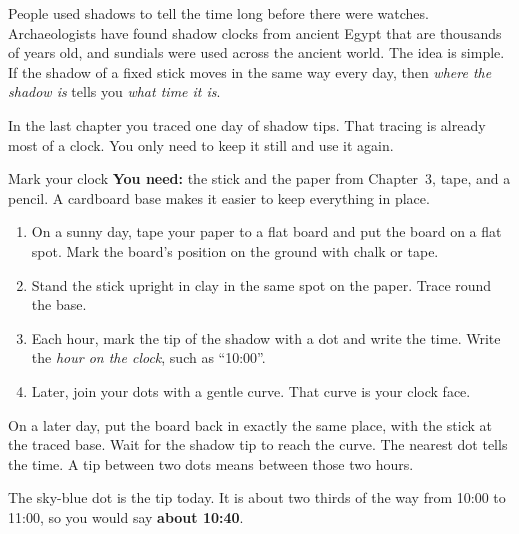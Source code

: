\label{ch4}

People used shadows to tell the time long before there were watches. Archaeologists have found shadow clocks from ancient Egypt that are thousands of years old, and sundials were used across the ancient world. The idea is simple. If the shadow of a fixed stick moves in the same way every day, then \emph{where the shadow is} tells you \emph{what time it is}.

In the last chapter you traced one day of shadow tips. That tracing is already most of a clock. You only need to keep it still and use it again.

\begin{tryit}{Mark your clock}
\textbf{You need:} the stick and the paper from Chapter~3, tape, and a pencil. A cardboard base makes it easier to keep everything in place.
\begin{enumerate}[leftmargin=1.6em]
\item On a sunny day, tape your paper to a flat board and put the board on a flat spot. Mark the board's position on the ground with chalk or tape.
\item Stand the stick upright in clay in the same spot on the paper. Trace round the base.
\item Each hour, mark the tip of the shadow with a dot and write the time. Write the \emph{hour on the clock}, such as ``10:00''.
\item Later, join your dots with a gentle curve. That curve is your clock face.
\end{enumerate}
\end{tryit}

On a later day, put the board back in exactly the same place, with the stick at the traced base. Wait for the shadow tip to reach the curve. The nearest dot tells the time. A tip between two dots means between those two hours.

\begin{center}
\end{center}
The sky-blue dot is the tip today. It is about two thirds of the way from 10:00 to 11:00, so you would say \textbf{about 10:40}.

